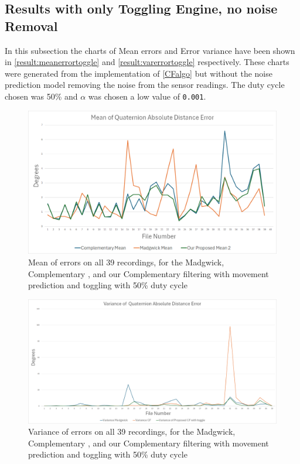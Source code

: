\documentclass{iutbscthesis}
\begin{document}
\subsection{Results with only Toggling Engine, no noise Removal}
In this subsection the charts of Mean errors and Error variance have been shown in \autoref{result:meanerrortoggle} and \autoref{result:varerrortoggle} respectively. These charts were generated from the implementation of \autoref{CFalgo} but without the noise prediction model removing the noise from the sensor readings. The duty cycle chosen was 50\% and $\alpha$ was chosen a low value of \texttt{0.001}. 

\begin{figure}[H]
    \centering
    \includegraphics[width=0.9\linewidth]{figures/mean_for_39_files.png}
    \caption{Mean of errors on all 39 recordings, for the Madgwick, Complementary , and our Complementary filtering with movement prediction and toggling with 50\% duty cycle}
    \label{result:meanerrortoggle}
\end{figure}

\begin{figure}[H]
    \centering
    \includegraphics[width=1\linewidth]{figures/variance_toggle.png}
    \caption{Variance of errors on all 39 recordings, for the Madgwick, Complementary , and our Complementary filtering with movement prediction and toggling with 50\% duty cycle}
    \label{result:varerrortoggle}
\end{figure}
\end{document}
